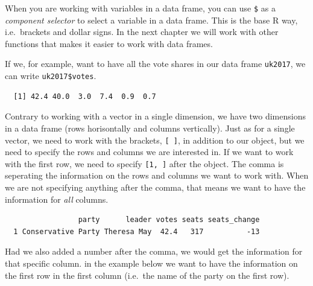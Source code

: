 \documentclass[12pt,oneside]{reedthesis}
\theoremstyle{definition}
\theoremstyle{definition}
\theoremstyle{definition}
\theoremstyle{remark}
\begin{document}
  When you are working with variables in a data frame, you can use
  \texttt{\$} as a \emph{component selector} to select a variable in a
  data frame. This is the base R way, i.e.~brackets and dollar signs. In
  the next chapter we will work with other functions that makes it easier
  to work with data frames.
  
  If we, for example, want to have all the vote shares in our data frame
  \texttt{uk2017}, we can write \texttt{uk2017\$votes}.
  \begin{Shaded}
  \begin{Highlighting}[]
  \OperatorTok{$}
  \end{Highlighting}
  \end{Shaded}
  \begin{verbatim}
  [1] 42.4 40.0  3.0  7.4  0.9  0.7
  \end{verbatim}
  Contrary to working with a vector in a single dimension, we have two
  dimensions in a data frame (rows horisontally and columns vertically).
  Just as for a single vector, we need to work with the brackets,
  \texttt{{[}\ {]}}, in addition to our object, but we need to specify the
  rows and columns we are interested in. If we want to work with the first
  row, we need to specify \texttt{{[}1,\ {]}} after the object. The comma
  is seperating the information on the rows and columns we want to work
  with. When we are not specifying anything after the comma, that means we
  want to have the information for \emph{all} columns.
  \begin{Shaded}
  \begin{Highlighting}[]
  \NormalTok{uk2017[}\NormalTok{,] }
  \end{Highlighting}
  \end{Shaded}
  \begin{verbatim}
                 party      leader votes seats seats_change
  1 Conservative Party Theresa May  42.4   317          -13
  \end{verbatim}
  Had we also added a number after the comma, we would get the information
  for that specific column. in the example below we want to have the
  information on the first row in the first column (i.e.~the name of the
  party on the first row).
  \begin{Shaded}
  \begin{Highlighting}[]
  \NormalTok{uk2017[}\NormalTok{, }\NormalTok{] }
  \end{Highlighting}
  \end{Shaded}
\end{document}
